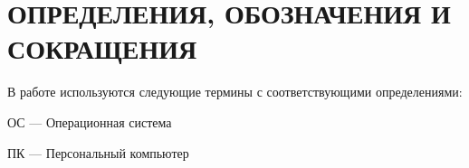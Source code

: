 \section*{\large ОПРЕДЕЛЕНИЯ, ОБОЗНАЧЕНИЯ И СОКРАЩЕНИЯ}
В работе используются следующие термины с соответствующими определениями:

ОС --- Операционная система

ПК --- Персональный компьютер

\pagebreak